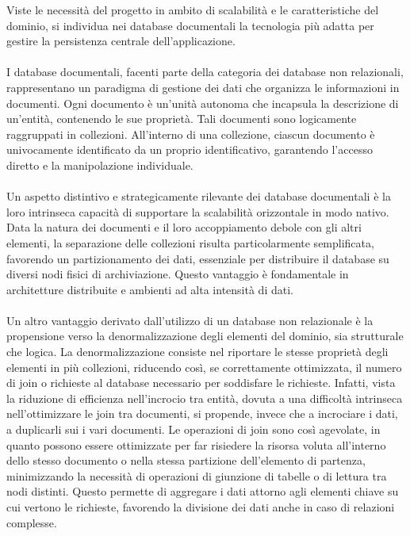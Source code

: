 Viste le necessità del progetto in ambito di scalabilità
e le caratteristiche del dominio,
si individua nei database documentali la tecnologia più adatta
per gestire la persistenza centrale dell'applicazione.\\
\\
I database documentali, facenti parte della categoria dei database non relazionali,
rappresentano un paradigma di gestione dei dati
che organizza le informazioni in documenti.
Ogni documento è un'unità autonoma che incapsula la descrizione di un'entità,
contenendo le sue proprietà.
Tali documenti sono logicamente raggruppati in collezioni.
All'interno di una collezione,
ciascun documento è univocamente identificato da un proprio identificativo,
garantendo l'accesso diretto e la manipolazione individuale.\\
\\
Un aspetto distintivo e strategicamente rilevante dei database documentali è
la loro intrinseca capacità di supportare la scalabilità orizzontale in modo nativo.
Data la natura dei documenti e il loro accoppiamento debole con gli altri elementi,
la separazione delle collezioni risulta particolarmente semplificata,
favorendo un partizionamento dei dati,  
essenziale per distribuire il database su diversi nodi fisici di archiviazione.
Questo vantaggio è fondamentale in architetture distribuite e ambienti ad alta intensità di dati.\\
\\
Un altro vantaggio derivato dall'utilizzo di un database non relazionale
è la propensione verso la denormalizzazione degli elementi del dominio, 
sia strutturale che logica.
La denormalizzazione consiste nel riportare le stesse proprietà degli elementi in più collezioni, 
riducendo così, se correttamente ottimizzata, 
il numero di join o richieste al database necessario per soddisfare le richieste.
Infatti, vista la riduzione di efficienza nell'incrocio tra entità, 
dovuta a una difficoltà intrinseca nell'ottimizzare le join tra documenti,
si propende, invece che a incrociare i dati, a duplicarli sui i vari documenti.
Le operazioni di join sono così agevolate,
in quanto possono essere ottimizzate per 
far risiedere la risorsa voluta all'interno dello stesso documento o nella stessa partizione dell'elemento di partenza, 
minimizzando la necessità di operazioni di giunzione di tabelle o di lettura tra nodi distinti.
Questo permette di aggregare i dati attorno agli elementi chiave su cui vertono le richieste,
favorendo la divisione dei dati anche in caso di relazioni complesse.\\
